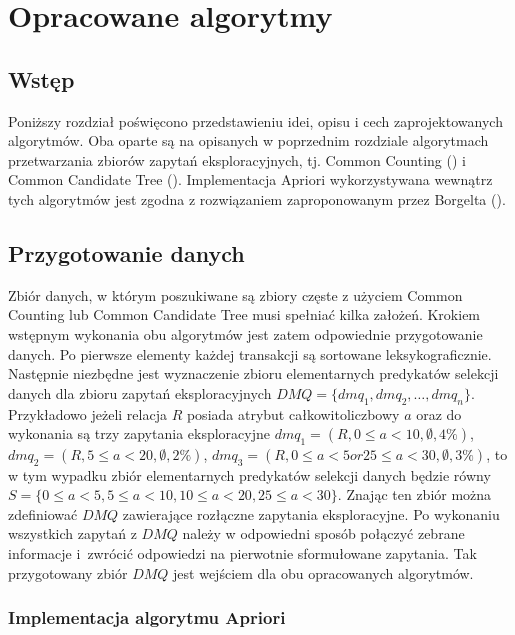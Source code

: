 \chapter{Opracowane algorytmy}
\label{c4}

\section{Wstęp}
\label{c41}
Poniższy rozdział poświęcono przedstawieniu idei, opisu i cech zaprojektowanych algorytmów. Oba oparte są na opisanych w poprzednim rozdziale algorytmach przetwarzania zbiorów zapytań eksploracyjnych, tj. Common Counting (\cite{WojciechowskiCC}) i Common Candidate Tree (\cite{WojciechowskiCCT}). Implementacja Apriori wykorzystywana wewnątrz tych algorytmów jest zgodna z rozwiązaniem zaproponowanym przez Borgelta (\cite{Borgelt}).


\section{Przygotowanie danych}
\label{c42}
Zbiór danych, w którym poszukiwane są zbiory częste z użyciem Common Counting lub Common Candidate Tree musi spełniać kilka założeń. Krokiem wstępnym wykonania obu algorytmów jest zatem odpowiednie przygotowanie danych. Po pierwsze elementy każdej transakcji są sortowane leksykograficznie. Następnie niezbędne jest wyznaczenie zbioru elementarnych predykatów selekcji danych dla zbioru zapytań eksploracyjnych \(DMQ = \{dmq_1, dmq_2, \dots, dmq_n\}\). Przykładowo jeżeli relacja \(R\) posiada atrybut całkowitoliczbowy \(a\) oraz do wykonania są trzy zapytania eksploracyjne \(dmq_1=(R, 0 \leq a < 10, \emptyset, 4\%)\), \(dmq_2=(R, 5\leq a < 20, \emptyset, 2\%)\), \(dmq_3=(R, 0\leq a < 5 or 25\leq a < 30, \emptyset, 3\%)\), to w tym wypadku zbiór elementarnych predykatów selekcji danych będzie równy  \(S = \{0\leq a < 5, 5\leq a < 10, 10\leq a < 20, 25\leq a < 30\}\). Znając ten zbiór można zdefiniować \(DMQ\) zawierające rozłączne zapytania eksploracyjne. Po wykonaniu wszystkich zapytań z \(DMQ\) należy w odpowiedni sposób połączyć zebrane informacje i~zwrócić odpowiedzi na pierwotnie sformułowane zapytania. Tak przygotowany zbiór \(DMQ\) jest wejściem dla obu opracowanych algorytmów.

\subsection{Implementacja algorytmu Apriori}
\label{c43}

